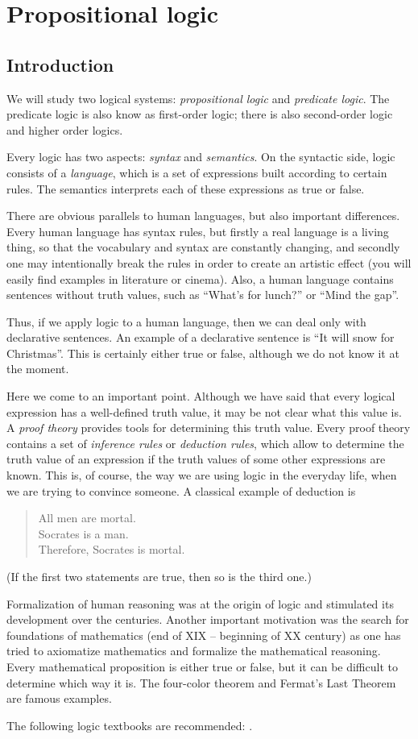 \chapter{Propositional logic}
\section*{Introduction}
We will study two logical systems: \emph{propositional logic} and \emph{predicate logic}.
The predicate logic is also know as first-order logic; there is also second-order logic and higher order logics.

Every logic has two aspects: \emph{syntax} and \emph{semantics}.
On the syntactic side, logic consists of a \emph{language}, which is a set of expressions built according to certain rules.
The semantics interprets each of these expressions as true or false.

There are obvious parallels to human languages, but also important differences.
Every human language has syntax rules, but firstly a real language is a living thing, so that the vocabulary and syntax are constantly changing,
and secondly one may intentionally break the rules in order to create an artistic effect (you will easily find examples in literature or cinema).
Also, a human language contains sentences without truth values, such as ``What's for lunch?'' or ``Mind the gap''.

Thus, if we apply logic to a human language, then we can deal only with declarative sentences.
An example of a declarative sentence is ``It will snow for Christmas''.
This is certainly either true or false, although we do not know it at the moment.

Here we come to an important point.
Although we have said that every logical expression has a well-defined truth value, it may be not clear what this value is.
A \emph{proof theory} provides tools for determining this truth value.
Every proof theory contains a set of \emph{inference rules} or \emph{deduction rules},
which allow to determine the truth value of an expression if the truth values of some other expressions are known.
This is, of course, the way we are using logic in the everyday life, when we are trying to convince someone.
A classical example of deduction is
\begin{quote}
All men are mortal.\\
Socrates is a man.\\
Therefore, Socrates is mortal.
\end{quote}
(If the first two statements are true, then so is the third one.)

Formalization of human reasoning was at the origin of logic and stimulated its development over the centuries.
Another important motivation was the search for foundations of mathematics (end of XIX -- beginning of XX century)
as one has tried to axiomatize mathematics and formalize the mathematical reasoning.
Every mathematical proposition is either true or false, but it can be difficult to determine which way it is.
The four-color theorem and Fermat's Last Theorem are famous examples.

The following logic textbooks are recommended: \cite{Gallier, CL1, CL2, Dalen}.


